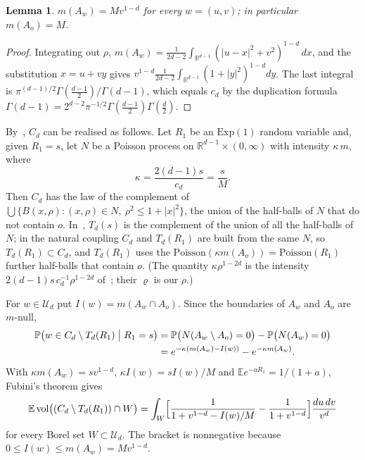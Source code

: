 \documentclass[11pt]{amsart}
\newtheorem{lemma}[theorem]{Lemma}
\theoremstyle{remark}
\newcommand{\R}{\mathbb{R}}
\newcommand{\E}{\mathbb{E}}
\newcommand{\Prob}{\mathbb{P}}
\newcommand{\vol}{\operatorname{vol}}
\begin{document}
\begin{lemma}\label{lem:measures}
$m(A_w)=Mv^{1-d}$ for every $w=(u,v)$; in particular $m(A_o)=M$.
\end{lemma}

\begin{proof}
Integrating out $\rho$, $m(A_w)=\frac1{2d-2}\int_{\R^{d-1}}(|u-x|^2+v^2)^{1-d}\,dx$, and the substitution $x=u+vy$ gives
$v^{1-d}\frac1{2d-2}\int_{\R^{d-1}}(1+|y|^2)^{1-d}dy$. The last integral is $\pi^{(d-1)/2}\Gamma(\frac{d-1}2)/\Gamma(d-1)$,
which equals $c_d$ by the duplication formula $\Gamma(d-1)=2^{d-2}\pi^{-1/2}\Gamma(\frac{d-1}2)\Gamma(\frac d2)$.
\end{proof}

By~\cite[Theorem~1.4 and its proof in Section~5.1]{DCELU}, $C_d$ can be realised as follows. Let $R_1$ be an
$\mathrm{Exp}(1)$ random variable and, given $R_1=s$, let $N$ be a Poisson process on $\R^{d-1}\times(0,\infty)$ with
intensity $\kappa\,m$, where
\[
\kappa=\frac{2(d-1)s}{c_d}=\frac sM .
\]
Then $C_d$ has the law of the complement of $\bigcup\{B(x,\rho):(x,\rho)\in N,\ \rho^2\le1+|x|^2\}$, the union of the
half-balls of $N$ that do not contain $o$. In~\cite[Section~5.3]{DCELU}, $T_d(s)$ is the complement of the union of all
the half-balls of $N$; in the natural coupling $C_d$ and $T_d(R_1)$ are built from the same $N$, so $T_d(R_1)\subset
C_d$, and $T_d(R_1)$ uses the $\mathrm{Poisson}(\kappa m(A_o))=\mathrm{Poisson}(R_1)$ further half-balls that contain $o$.
(The quantity $\kappa\rho^{1-2d}$ is the intensity $2(d-1)s\,c_d^{-1}\rho^{1-2d}$ of~\cite[(5.4)]{DCELU}; their $\varrho$
is our $\rho$.)

For $w\in\mathcal U_d$ put $I(w)=m(A_w\cap A_o)$. Since the boundaries of $A_w$ and $A_o$ are $m$-null,
\begin{align*}
\Prob\bigl(w\in C_d\setminus T_d(R_1)\bigm|R_1=s\bigr)&=\Prob\bigl(N(A_w\setminus A_o)=0\bigr)-\Prob\bigl(N(A_w)=0\bigr)\\
&=e^{-\kappa(m(A_w)-I(w))}-e^{-\kappa m(A_w)} .
\end{align*}
With $\kappa m(A_w)=sv^{1-d}$, $\kappa I(w)=sI(w)/M$ and $\E e^{-aR_1}=1/(1+a)$, Fubini's theorem gives
\begin{equation}\label{eq:coupling-integral}
\E\vol\bigl((C_d\setminus T_d(R_1))\cap W\bigr)=\int_W\Bigl[\frac1{1+v^{1-d}-I(w)/M}-\frac1{1+v^{1-d}}\Bigr]
\frac{du\,dv}{v^d}
\end{equation}
for every Borel set $W\subset\mathcal U_d$. The bracket is nonnegative because $0\le I(w)\le m(A_w)=Mv^{1-d}$.
\end{document}
